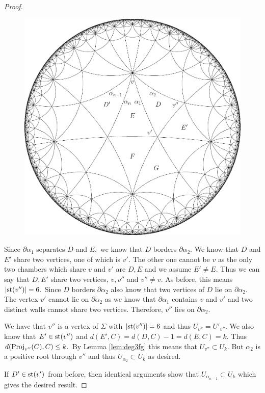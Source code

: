 \documentclass[class=book, crop=false]{standalone}
\begin{document}
\begin{proof}
\begin{figure}[h]
	\label{fig:33n}
	\begin{center}
		\includegraphics[width=4.5 in]{diagrams/deg33n.pdf}
\end{center}
\end{figure}


	Since $\partial\alpha_1$ separates $D$ and $E,$ we know that $D$ borders $\partial \alpha_2.$ We know that $D$ and $E'$ share two vertices, one of which is $v'.$ The other one cannot be $v$ as the only two chambers which share $v$ and $v'$ are $D,E$ and we assume $E'\neq E.$ Thus we can say that $D,E'$ share two vertices, $v,v''$ and $v''\neq v.$ As before, this means $|\mathrm{st}(v'')|=6.$ Since $D$ borders $\partial \alpha_2$ also know that two vertices of $D$ lie on $\partial \alpha_2.$ The vertex $v'$ cannot lie on $\partial\alpha_2$ as we know that $\partial\alpha_1$ contains $v$ and $v'$ and two distinct walls cannot share two vertices. Therefore, $v''$ lies on $\partial \alpha_2.$ 

	We have that $v''$ is a vertex of $\Sigma$ with $|\mathrm{st}(v'')|=6$ and thus $U_{v''}=U'_{v''}.$ We also know that $E'\in \mathrm{st}(v'')$ and $d(E',C)=d(D,C)-1=d(E,C)=k.$ Thus $d(\mathrm{Proj}_{v''}(C),C)\le k.$ By Lemma \ref{lem:deg3fg} this means that $U_{v''}\subset U_k.$ But $\alpha_2$ is a positive root through $v''$ and thus $U_{\alpha_2}\subset U_k$ as desired.

	If $D'\in \mathrm{st}(v')$ from before, then identical arguments show that $U_{\alpha_{n-1}}\subset U_k$ which gives the desired result.
\end{proof}
\end{document}
